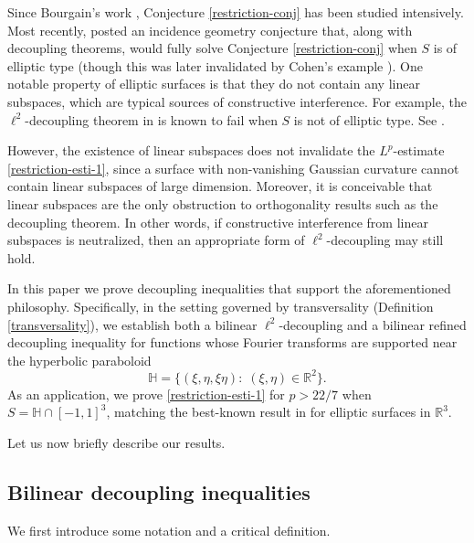 \documentclass{amsart}%
\numberwithin{equation}{section}
\newcommand{\ZR}{\mathbb{R}}
\newcommand{\ZH}{\mathbb{H}}
\newcommand{\R}{\mathbb{R}}
\newcommand{\1}{\mathbbm{1}}
\begin{document}
Since Bourgain's work \cite{Bourgain-Besicovitch}, Conjecture \ref{restriction-conj} has been studied intensively.
Most recently, \cite{Wang-Wu} posted an incidence geometry conjecture that, along with decoupling theorems, would fully solve Conjecture \ref{restriction-conj} when $S$ is of elliptic type (though this was later invalidated by Cohen's example \cite{Cohen-example}).
One notable property of elliptic surfaces is that they do not contain any linear subspaces, which are typical sources of constructive interference.
For example, the $\ell^2$-decoupling theorem in \cite{Bourgain-Demeter-l2} is known to fail when $S$ is not of elliptic type. 
See \cite{BDh}. 

However, the existence of linear subspaces does not invalidate the $L^p$-estimate \eqref{restriction-esti-1}, since a surface with non-vanishing Gaussian curvature cannot contain linear subspaces of large dimension.
Moreover, it is conceivable that linear subspaces are the only obstruction to orthogonality results such as the decoupling theorem.
In other words, if constructive interference from linear subspaces is neutralized, then an appropriate form of  $\ell^2$-decoupling  may still hold.

\smallskip

In this paper we prove decoupling inequalities that support the aforementioned philosophy.
Specifically, in the setting governed by transversality (Definition \ref{transversality}), we establish both a bilinear $\ell^2$-decoupling  and a bilinear refined decoupling inequality for functions whose Fourier transforms are supported near the hyperbolic paraboloid
\begin{equation}
\label{hyperboloid}
    \ZH=\{(\xi,\eta,\xi\eta):\;(\xi,\eta)\in\R^2\}.
\end{equation}
As an application, we prove \eqref{restriction-esti-1} for $p>22/7$ when $S=\ZH\cap [-1,1]^3$, matching the best-known result in \cite{Wang-Wu} for elliptic surfaces in $\ZR^3$.

Let us now briefly describe our results.


\medskip

\subsection{Bilinear decoupling inequalities}

We first introduce some notation and a critical definition.

\smallskip
\end{document}
